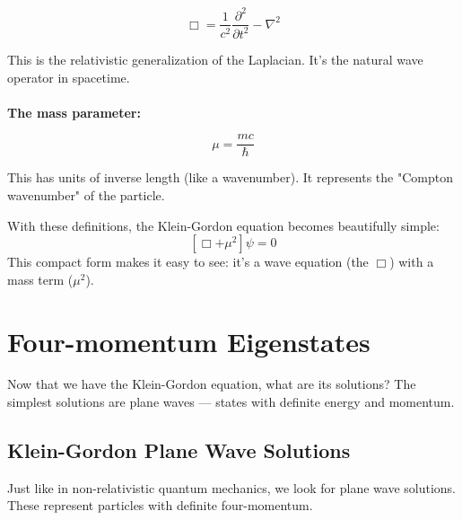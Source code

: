 \documentclass{report}
\begin{document}
\begin{equation}
	\Box = \frac{1}{c^2}\frac{ \partial^2 }{ \partial t^2 } - \nabla^2
\end{equation}


This is the relativistic generalization of the Laplacian. It's the natural wave operator in spacetime.\\
\\
\textbf{The mass parameter:}

\begin{equation}
	\mu = \frac{mc}{\hbar}
\end{equation}

This has units of inverse length (like a wavenumber). It represents the "Compton wavenumber" of the particle.

With these definitions, the Klein-Gordon equation becomes beautifully simple:
\begin{equation}
	\left[\Box + \mu^2\right]\psi = 0
\end{equation}
This compact form makes it easy to see: it's a wave equation (the $\Box$) with a mass term ($\mu^2$).
\\
\chapter{Four-momentum Eigenstates}
Now that we have the Klein-Gordon equation, what are its solutions? The simplest solutions are plane waves --- states with definite energy and momentum.

\section{Klein-Gordon Plane Wave Solutions}
Just like in non-relativistic quantum mechanics, we look for plane wave solutions. These represent particles with definite four-momentum.
\end{document}
